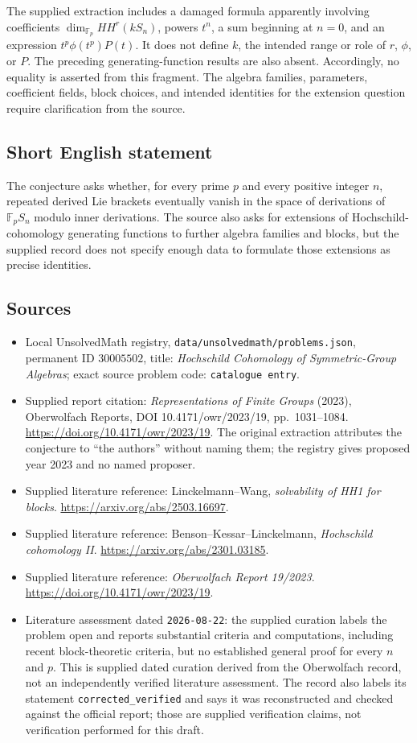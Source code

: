 \documentclass[11pt]{article}
\newcommand{\F}{\mathbb{F}}
\begin{document}
The supplied extraction includes a damaged formula apparently involving coefficients \(\dim_{\F_p}HH^r(kS_n)\), powers \(t^n\), a sum beginning at \(n=0\), and an expression \(t^p\phi(t^p)P(t)\). It does not define \(k\), the intended range or role of \(r\), \(\phi\), or \(P\). The preceding generating-function results are also absent. Accordingly, no equality is asserted from this fragment. The algebra families, parameters, coefficient fields, block choices, and intended identities for the extension question require clarification from the source.
\subsection{Short English statement}
The conjecture asks whether, for every prime \(p\) and every positive integer \(n\), repeated derived Lie brackets eventually vanish in the space of derivations of \(\F_pS_n\) modulo inner derivations. The source also asks for extensions of Hochschild-cohomology generating functions to further algebra families and blocks, but the supplied record does not specify enough data to formulate those extensions as precise identities.
\subsection{Sources}
\begin{itemize}
\item Local UnsolvedMath registry, \texttt{data/unsolvedmath/problems.json}, permanent ID \(30005502\), title: \emph{Hochschild Cohomology of Symmetric-Group Algebras}; exact source problem code: \texttt{catalogue entry}.
\item Supplied report citation: \emph{Representations of Finite Groups} (2023), Oberwolfach Reports, DOI 10.4171/owr/2023/19, pp.\ 1031--1084. \url{https://doi.org/10.4171/owr/2023/19}. The original extraction attributes the conjecture to ``the authors'' without naming them; the registry gives proposed year 2023 and no named proposer.
\item Supplied literature reference: Linckelmann--Wang, \emph{solvability of HH1 for blocks}. \url{https://arxiv.org/abs/2503.16697}.
\item Supplied literature reference: Benson--Kessar--Linckelmann, \emph{Hochschild cohomology II}. \url{https://arxiv.org/abs/2301.03185}.
\item Supplied literature reference: \emph{Oberwolfach Report 19/2023}. \url{https://doi.org/10.4171/owr/2023/19}.
\item Literature assessment dated \texttt{2026-08-22}: the supplied curation labels the problem open and reports substantial criteria and computations, including recent block-theoretic criteria, but no established general proof for every \(n\) and \(p\). This is supplied dated curation derived from the Oberwolfach record, not an independently verified literature assessment. The record also labels its statement \texttt{corrected\_verified} and says it was reconstructed and checked against the official report; those are supplied verification claims, not verification performed for this draft.
\end{itemize}
\end{document}
